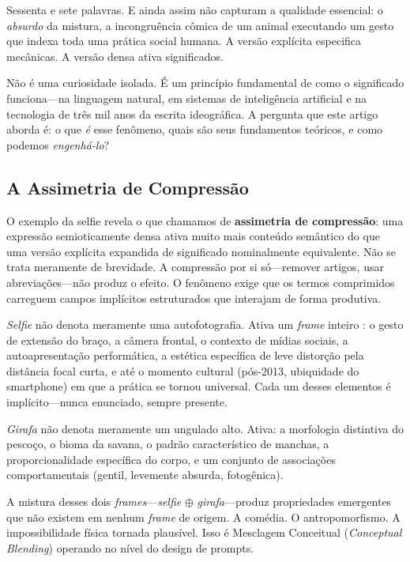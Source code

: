 \documentclass[12pt,a4paper]{article}
\begin{document}
Sessenta e sete palavras.
E ainda assim não capturam a qualidade essencial: o \textit{absurdo} da mistura, a incongruência cômica de um animal executando um gesto que indexa toda uma prática social humana.
A versão explícita especifica mecânicas.
A versão densa ativa significados.

Não é uma curiosidade isolada.
É um princípio fundamental de como o significado funciona---na linguagem natural, em sistemas de inteligência artificial e na tecnologia de três mil anos da escrita ideográfica.
A pergunta que este artigo aborda é: o que \textit{é} esse fenômeno, quais são seus fundamentos teóricos, e como podemos \textit{engenhá-lo}?

\subsection{A Assimetria de Compressão}

O exemplo da selfie revela o que chamamos de \textbf{assimetria de compressão}: uma expressão semioticamente densa ativa muito mais conteúdo semântico do que uma versão explícita expandida de significado nominalmente equivalente.
Não se trata meramente de brevidade.
A compressão por si só---remover artigos, usar abreviações---não produz o efeito.
O fenômeno exige que os termos comprimidos carreguem campos implícitos estruturados que interajam de forma produtiva.

\textit{Selfie} não denota meramente uma autofotografia.
Ativa um \textit{frame} inteiro \cite{fillmore1982}: o gesto de extensão do braço, a câmera frontal, o contexto de mídias sociais, a autoapresentação performática, a estética específica de leve distorção pela distância focal curta, e até o momento cultural (pós-2013, ubiquidade do smartphone) em que a prática se tornou universal.
Cada um desses elementos é implícito---nunca enunciado, sempre presente.

\textit{Girafa} não denota meramente um ungulado alto.
Ativa: a morfologia distintiva do pescoço, o bioma da savana, o padrão característico de manchas, a proporcionalidade específica do corpo, e um conjunto de associações comportamentais (gentil, levemente absurda, fotogênica).

A mistura desses dois \textit{frames}---\textit{selfie} $\oplus$ \textit{girafa}---produz propriedades emergentes que não existem em nenhum \textit{frame} de origem.
A comédia.
O antropomorfismo.
A impossibilidade física tornada plausível.
Isso é Mesclagem Conceitual (\textit{Conceptual Blending}) \cite{fauconnier2002} operando no nível do design de prompts.
\end{document}
